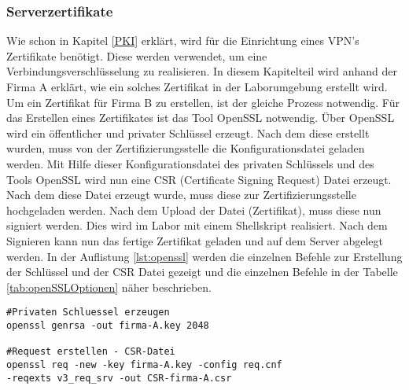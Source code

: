 \subsubsection{Serverzertifikate}
Wie schon in Kapitel \ref{PKI} erklärt, wird für die  Einrichtung eines VPN's Zertifikate benötigt. Diese werden verwendet, um eine Verbindungsverschlüsselung zu realisieren. In diesem Kapitelteil wird anhand der Firma A erklärt, wie ein solches Zertifikat in der Laborumgebung erstellt wird. Um ein Zertifikat für Firma B zu erstellen, ist der gleiche Prozess notwendig. \newline
Für das Erstellen eines Zertifikates ist das Tool OpenSSL notwendig. Über OpenSSL wird ein öffentlicher und privater Schlüssel erzeugt. Nach dem diese erstellt wurden, muss von der Zertifizierungsstelle die Konfigurationsdatei geladen werden. Mit Hilfe dieser Konfigurationsdatei des privaten Schlüssels und des Tools OpenSSL wird nun eine CSR (Certificate Signing Request) Datei erzeugt. Nach dem diese Datei erzeugt wurde, muss diese zur Zertifizierungsstelle hochgeladen werden. Nach dem Upload der Datei (Zertifikat), muss diese nun signiert werden. Dies wird im Labor mit einem Shellskript realisiert. Nach dem Signieren kann nun das fertige Zertifikat geladen und auf dem Server 
abgelegt werden. In der Auflistung \ref{lst:openssl}  werden die einzelnen Befehle zur Erstellung der Schlüssel und der CSR Datei gezeigt und die einzelnen Befehle in der Tabelle \ref{tab:openSSLOptionen} näher beschrieben.\newline
\lstset{
	basicstyle=\footnotesize, frame=tb,
	xleftmargin=.2\textwidth, xrightmargin=.2\textwidth
}
\begin{lstlisting}[caption={Erzeugen eines privaten Schlüssels mit OpenSSL},label=lst:openssl]
#Privaten Schluessel erzeugen
openssl genrsa -out firma-A.key 2048

#Request erstellen - CSR-Datei
openssl req -new -key firma-A.key -config req.cnf 
-reqexts v3_req_srv -out CSR-firma-A.csr
\end{lstlisting}
\vspace{\baselineskip}
